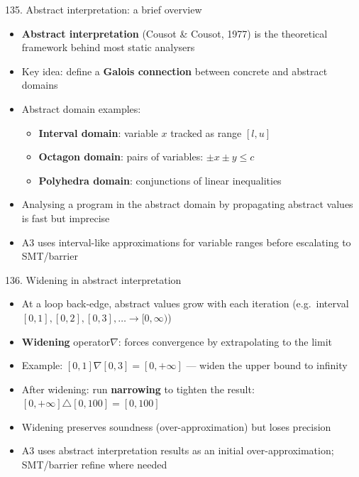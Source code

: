 \documentclass[aspectratio=169]{beamer}
\begin{document}
\begin{frame}{135. Abstract interpretation: a brief overview}
\begin{itemize}
  \item \textbf{Abstract interpretation} (Cousot \& Cousot, 1977) is the theoretical framework behind most static analysers
  \item Key idea: define a \textbf{Galois connection} between concrete and abstract domains
  \item Abstract domain examples:
    \begin{itemize}
      \item \textbf{Interval domain}: variable \(x\) tracked as range \([l, u]\)
      \item \textbf{Octagon domain}: pairs of variables: \(\pm x \pm y \le c\)
      \item \textbf{Polyhedra domain}: conjunctions of linear inequalities
    \end{itemize}
  \item Analysing a program in the abstract domain by propagating abstract values is fast but imprecise
  \item A3 uses interval-like approximations for variable ranges before escalating to SMT/barrier
\end{itemize}
\end{frame}

\begin{frame}{136. Widening in abstract interpretation}
\begin{itemize}
  \item At a loop back-edge, abstract values grow with each iteration (e.g.\ interval \([0,1], [0,2], [0,3], \ldots \to [0, \infty)\))
  \item \textbf{Widening} operator\(\nabla\): forces convergence by extrapolating to the limit
  \item Example: \([0,1] \nabla [0,3] = [0, +\infty]\) --- widen the upper bound to infinity
  \item After widening: run \textbf{narrowing} to tighten the result: \([0, +\infty] \triangle [0,100] = [0, 100]\)
  \item Widening preserves soundness (over-approximation) but loses precision
  \item A3 uses abstract interpretation results as an initial over-approximation; SMT/barrier refine where needed
\end{itemize}
\end{frame}
\end{document}
